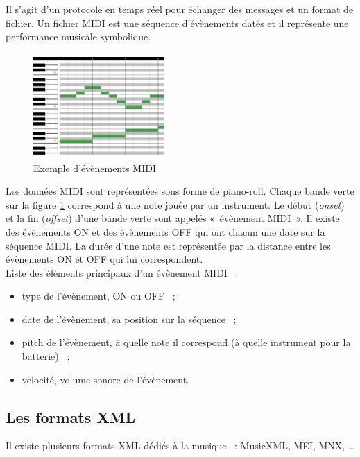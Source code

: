Il s’agit d’un protocole en temps réel pour échanger des messages et un format
de fichier. Un fichier MIDI est une séquence d’évènements datés et il
représente une performance musicale symbolique.

\begin{figure}[h]
	\centering
	\includegraphics[height=40mm, width=50mm]{
    z_images/1_contexte/2_midi_piano.jpg}
	\caption{Exemple d’évènements MIDI}
	\label{piano_roll}
\end{figure}
Les données MIDI sont représentées sous forme de piano-roll. Chaque bande verte
sur la figure \ref{piano_roll} correspond à une note jouée par un instrument.
Le début (\textit{onset}) et la fin (\textit{offset}) d’une bande verte sont
appelés «~évènement MIDI~». Il existe des évènements ON et des évènements OFF
qui ont chacun une date sur la séquence MIDI. La durée d’une note est
représentée par la distance entre les évènements ON et OFF qui lui
correspondent.\\

Liste des élèments principaux d’un évènement MIDI~ :
\begin{itemize}
    \item type de l’évènement, ON ou OFF~ ;
    \item date de l’évènement, sa position sur la séquence~ ;
    \item pitch de l’évènement, à quelle note il correspond (à quelle
        instrument pour la batterie)~ ;
    \item velocité, volume sonore de l’évènement.\\
\end{itemize}


\subsection*{Les formats XML}
Il existe plusieurs formats XML dédiés à la musique~ : MusicXML, MEI, MNX, …

